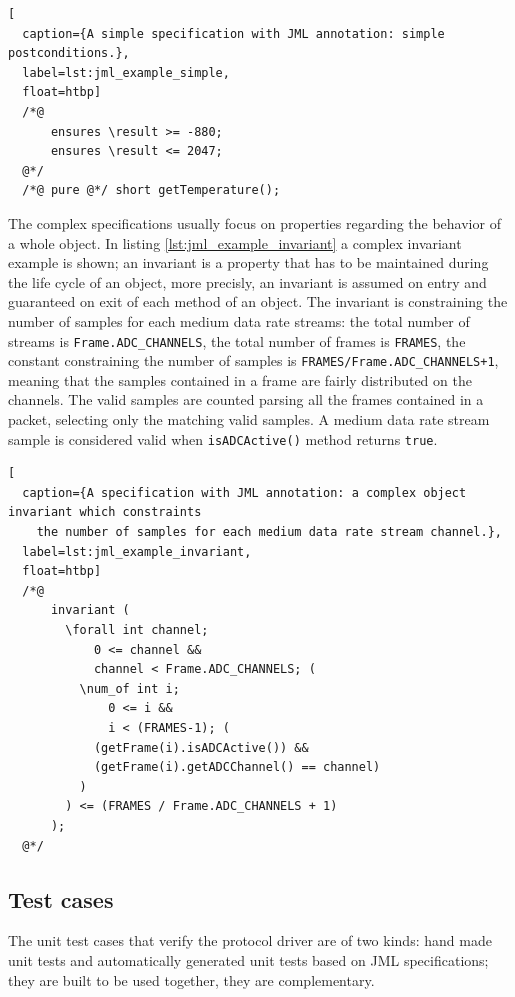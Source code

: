 \documentclass{article}
\newcommand{\lil}[1]{\texttt{\lstinline|#1|}}
\begin{document}
\begin{lstlisting}[
  caption={A simple specification with JML annotation: simple postconditions.},
  label=lst:jml_example_simple,
  float=htbp]
  /*@ 
      ensures \result >= -880; 
      ensures \result <= 2047; 
  @*/ 
  /*@ pure @*/ short getTemperature();
\end{lstlisting}

\sloppy

The complex specifications usually focus on properties regarding the behavior of a whole object.
In listing \ref{lst:jml_example_invariant} a complex invariant example is shown; an invariant is a property that has to be maintained during the life cycle of an object, more precisly, an invariant is assumed on entry and guaranteed on exit of each method of an object. 
The invariant is constraining the number of samples for each medium data rate streams: the total number of streams is \lil{Frame.ADC_CHANNELS}, the total number of frames is \lil{FRAMES}, the constant constraining the number of samples is \lil{FRAMES/Frame.ADC_CHANNELS+1}, meaning that the samples contained in a frame are fairly distributed on the channels.
The valid samples are counted parsing all the frames contained in a packet, selecting only the matching valid samples.  
A medium data rate stream sample is considered valid when \lil{isADCActive()} method returns \lil{true}.

\fussy

\begin{lstlisting}[
  caption={A specification with JML annotation: a complex object invariant which constraints 
    the number of samples for each medium data rate stream channel.},
  label=lst:jml_example_invariant,
  float=htbp]
  /*@ 
      invariant ( 
        \forall int channel; 
            0 <= channel && 
            channel < Frame.ADC_CHANNELS; ( 
          \num_of int i; 
              0 <= i && 
              i < (FRAMES-1); (
            (getFrame(i).isADCActive()) && 
            (getFrame(i).getADCChannel() == channel)
          ) 
        ) <= (FRAMES / Frame.ADC_CHANNELS + 1) 
      ); 
  @*/
\end{lstlisting}



\subsection{Test cases}
\label{subsec:test_cases}

The unit test cases that verify the protocol driver are of two kinds: hand made unit tests and automatically generated unit tests based on JML specifications; they are built to be used together, they are complementary.  
\end{document}
